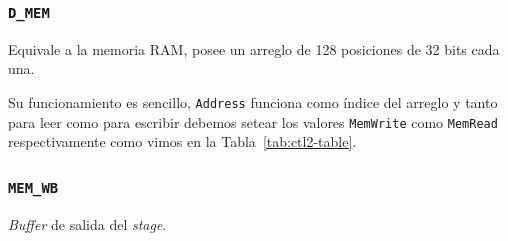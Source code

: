 \documentclass[a4paper]{article}
\begin{document}
\subsubsection{\texttt{D\_MEM}}
Equivale a la memoria RAM, posee un arreglo de 128 posiciones de 32 bits cada una.

Su funcionamiento es sencillo, \texttt{Address} funciona como índice del arreglo y tanto para leer como para escribir debemos setear los valores \texttt{MemWrite} como \texttt{MemRead} respectivamente como vimos en la Tabla~\ref{tab:ctl2-table}.

\subsubsection{\texttt{MEM\_WB}}
\textit{Buffer} de salida del \textit{stage}.

%

%
\end{document}
